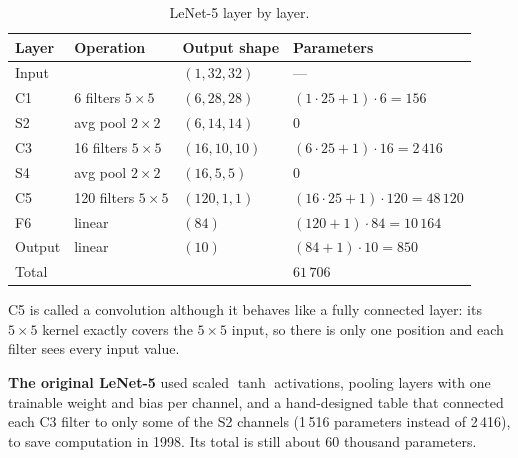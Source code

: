 \documentclass[12pt, a4paper]{article}
\begin{document}
\begin{table}[H]
  \centering
  \renewcommand{\arraystretch}{1.35}
  \begin{tabular}{llll}
    \toprule
    Layer                     & Operation              & Output shape   & Parameters                        \\
    \midrule
    Input                     &                        & $(1, 32, 32)$  & ---                               \\
    C1                        & 6 filters $5\times5$   & $(6, 28, 28)$  & $(1\cdot25+1)\cdot6 = 156$        \\
    S2                        & avg pool $2\times2$    & $(6, 14, 14)$  & $0$                               \\
    C3                        & 16 filters $5\times5$  & $(16, 10, 10)$ & $(6\cdot25+1)\cdot16 = 2\,416$    \\
    S4                        & avg pool $2\times2$    & $(16, 5, 5)$   & $0$                               \\
    C5                        & 120 filters $5\times5$ & $(120, 1, 1)$  & $(16\cdot25+1)\cdot120 = 48\,120$ \\
    F6                        & linear                 & $(84)$         & $(120+1)\cdot84 = 10\,164$        \\
    Output                    & linear                 & $(10)$         & $(84+1)\cdot10 = 850$             \\
    \midrule
    \multicolumn{3}{l}{Total} & $61\,706$                                                                   \\
    \bottomrule
  \end{tabular}
  \caption{LeNet-5 layer by layer.}
  \label{tab:lenet}
\end{table}

C5 is called a convolution although it behaves like a fully connected layer:
its $5\times5$ kernel exactly covers the $5\times5$ input, so there is only
one position and each filter sees every input value.

\begin{notebox}
  \textbf{The original LeNet-5} used scaled $\tanh$ activations, pooling
  layers with one trainable weight and bias per channel, and a hand-designed
  table that connected each C3 filter to only some of the S2 channels
  (1\,516 parameters instead of 2\,416), to save computation in 1998.
  Its total is still about 60 thousand parameters.
\end{notebox}
\end{document}

